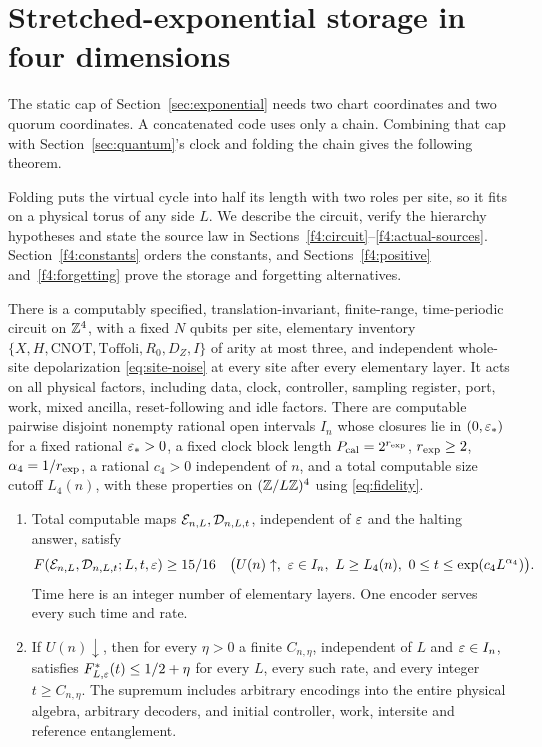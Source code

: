 \section{Stretched-exponential storage in four dimensions}\label{sec:four-dimensional}
The static cap of Section~\ref{sec:exponential} needs two chart
coordinates and two quorum coordinates. A concatenated code uses only
a chain. Combining that cap with Section~\ref{sec:quantum}'s clock
and folding the chain gives the following theorem.

Folding puts the virtual cycle into half its length with two roles per site, so it fits on a physical torus of any side \(L\). We describe the circuit, verify the hierarchy hypotheses and state the source law in Sections~\ref{f4:circuit}--\ref{f4:actual-sources}. Section~\ref{f4:constants} orders the constants, and Sections~\ref{f4:positive} and~\ref{f4:forgetting} prove the storage and forgetting alternatives.

\begin{theorem}\label{f4:detailed}
There is a computably specified, translation-invariant, finite-range,
time-periodic circuit on \(\mathbb Z^4\), with a fixed \(N\) qubits per site,
elementary inventory
\(\{X,H,\mathrm{CNOT},\mathrm{Toffoli},R_0,D_Z,I\}\) of arity at
most three, and independent whole-site depolarization
\eqref{eq:site-noise} at every site after every elementary layer.
It acts on all physical factors, including data, clock, controller,
sampling register, port, work, mixed ancilla, reset-following and idle factors. There are
computable pairwise disjoint nonempty rational open intervals \(I_n\)
whose closures lie in \((0,\varepsilon_*)\) for a fixed rational
\(\varepsilon_*>0\), a fixed clock block length \(P_{\rm cal}=2^{r_{\rm exp}}\), \(r_{\rm exp}\ge2\),
\(\alpha_4=1/r_{\rm exp}\), a rational \(c_4>0\) independent of \(n\),
and a total computable size cutoff \(L_4(n)\), with these properties on
\((\mathbb Z/L\mathbb Z)^4\) using \eqref{eq:fidelity}.
\begin{enumerate}
\item Total computable maps \(\mathcal E_{n,L},\mathcal D_{n,L,t}\), independent
of \(\varepsilon\) and the halting answer, satisfy
\[
 F(\mathcal E_{n,L},\mathcal D_{n,L,t};L,t,\varepsilon)\ge15/16
 \quad\bigl(U(n)\uparrow,\ \varepsilon\in I_n,\ L\ge L_4(n),\
               0\le t\le\exp(c_4L^{\alpha_4})\bigr).
\]
Time here is an integer number of elementary layers. One encoder
serves every such time and rate.
\item If \(U(n)\downarrow\), then for every \(\eta>0\) a finite
\(C_{n,\eta}\), independent of \(L\) and \(\varepsilon\in I_n\), satisfies
\(F^*_{L,\varepsilon}(t)\le1/2+\eta\) for every \(L\), every such rate,
and every integer \(t\ge C_{n,\eta}\). The supremum includes
arbitrary encodings into the entire physical algebra, arbitrary
decoders, and initial controller, work, intersite and reference
entanglement.
\end{enumerate}
\end{theorem}

